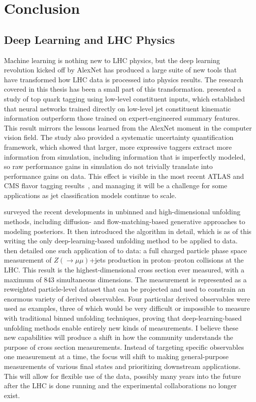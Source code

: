 
\chapter{Conclusion}
\label{ch:conclusion}

\section{Deep Learning and LHC Physics}
\label{sec:conclusion-dl-lhc}

Machine learning is nothing new to LHC physics, but the deep learning revolution kicked off by AlexNet has produced a large suite of new tools that have transformed how LHC data is processed into physics results.
The research covered in this thesis has been a small part of this transformation.
 presented a study of top quark tagging using low-level constituent inputs, which established that neural networks trained directly on low-level jet constituent kinematic information outperform those trained on expert-engineered summary features.
This result mirrors the lessons learned from the AlexNet moment in the computer vision field.
The study also provided a systematic uncertainty quantification framework, which showed that larger, more expressive taggers extract more information from simulation, including information that is imperfectly modeled, so raw performance gains in simulation do not trivially translate into performance gains on data.
This effect is visible in the most recent ATLAS and CMS flavor tagging results~\cite{ATLAS:2025dkv,Sarkar:2024vjz}, and managing it will be a challenge for some applications as jet classification models continue to scale.

 surveyed the recent developments in unbinned and high-dimensional unfolding methods, including diffusion- and flow-matching-based generative approaches to modeling posteriors.
It then introduced the \Omnifold algorithm in detail, which is as of this writing the only deep-learning-based unfolding method to be applied to data.
 then detailed one such application of \Omnifold to data: a full charged particle phase space measurement of $Z(\to\mu\mu)$+jets production in proton--proton collisions at the LHC.
This result is the highest-dimensional cross section ever measured, with a maximum of 843 simultaneous dimensions.
The measurement is represented as a reweighted particle-level dataset that can be projected and used to constrain an enormous variety of derived observables.
Four particular derived observables were used as examples, three of which would be very difficult or impossible to measure with traditional binned unfolding techniques, proving that deep-learning-based unfolding methods enable entirely new kinds of measurements.
I believe these new capabilities will produce a shift in how the community understands the purpose of cross section measurements.
Instead of targeting specific observables one measurement at a time, the focus will shift to making general-purpose measurements of various final states and prioritizing downstream applications.
This will allow for flexible use of the data, possibly many years into the future after the LHC is done running and the experimental collaborations no longer exist.

